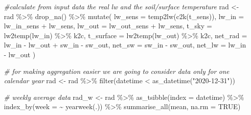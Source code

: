 \documentclass[
]{article}
\newenvironment{Shaded}{\begin{snugshade}}{\end{snugshade}}
\newcommand{\AttributeTok}[1]{\textcolor[rgb]{0.77,0.63,0.00}{#1}}
\newcommand{\CommentTok}[1]{\textcolor[rgb]{0.56,0.35,0.01}{\textit{#1}}}
\newcommand{\ConstantTok}[1]{\textcolor[rgb]{0.00,0.00,0.00}{#1}}
\newcommand{\FunctionTok}[1]{\textcolor[rgb]{0.00,0.00,0.00}{#1}}
\newcommand{\NormalTok}[1]{#1}
\newcommand{\OtherTok}[1]{\textcolor[rgb]{0.56,0.35,0.01}{#1}}
\newcommand{\SpecialCharTok}[1]{\textcolor[rgb]{0.00,0.00,0.00}{#1}}
\newcommand{\StringTok}[1]{\textcolor[rgb]{0.31,0.60,0.02}{#1}}
\begin{document}
\begin{Shaded}
\begin{Highlighting}[]
\CommentTok{\#calculate from input data the real lw and the soil/surface temperature}
\NormalTok{rad }\OtherTok{\textless{}{-}}\NormalTok{ rad }\SpecialCharTok{\%\textgreater{}\%}
  \FunctionTok{drop\_na}\NormalTok{() }\SpecialCharTok{\%\textgreater{}\%}
  \FunctionTok{mutate}\NormalTok{(}
    \AttributeTok{lw\_sens =} \FunctionTok{temp2lw}\NormalTok{(}\FunctionTok{c2k}\NormalTok{(t\_sens)),}
    \AttributeTok{lw\_in =}\NormalTok{ lw\_in\_sens }\SpecialCharTok{+}\NormalTok{ lw\_sens,}
    \AttributeTok{lw\_out =}\NormalTok{ lw\_out\_sens }\SpecialCharTok{+}\NormalTok{ lw\_sens,}
    \AttributeTok{t\_sky =} \FunctionTok{lw2temp}\NormalTok{(lw\_in) }\SpecialCharTok{\%\textgreater{}\%}\NormalTok{ k2c,}
    \AttributeTok{t\_surface =} \FunctionTok{lw2temp}\NormalTok{(lw\_out) }\SpecialCharTok{\%\textgreater{}\%}\NormalTok{ k2c,}
    \AttributeTok{net\_rad =}\NormalTok{ lw\_in }\SpecialCharTok{{-}}\NormalTok{ lw\_out }\SpecialCharTok{+}\NormalTok{ sw\_in }\SpecialCharTok{{-}}\NormalTok{ sw\_out,}
    \AttributeTok{net\_sw =}\NormalTok{ sw\_in }\SpecialCharTok{{-}}\NormalTok{ sw\_out,}
    \AttributeTok{net\_lw =}\NormalTok{ lw\_in }\SpecialCharTok{{-}}\NormalTok{ lw\_out}
\NormalTok{  )}
\end{Highlighting}
\end{Shaded}

\begin{Shaded}
\begin{Highlighting}[]
\CommentTok{\# for making aggregation easier we are going to consider data only for one calendar year}
\NormalTok{rad }\OtherTok{\textless{}{-}}\NormalTok{ rad }\SpecialCharTok{\%\textgreater{}\%}
  \FunctionTok{filter}\NormalTok{(datetime }\SpecialCharTok{\textless{}} \FunctionTok{as\_datetime}\NormalTok{(}\StringTok{"2020{-}12{-}31"}\NormalTok{))}
\end{Highlighting}
\end{Shaded}

\begin{Shaded}
\begin{Highlighting}[]
\CommentTok{\# weekly average data}
\NormalTok{rad\_w }\OtherTok{\textless{}{-}}\NormalTok{ rad }\SpecialCharTok{\%\textgreater{}\%} 
  \FunctionTok{as\_tsibble}\NormalTok{(}\AttributeTok{index =}\NormalTok{ datetime) }\SpecialCharTok{\%\textgreater{}\%}
  \FunctionTok{index\_by}\NormalTok{(}\AttributeTok{week =} \SpecialCharTok{\textasciitilde{}} \FunctionTok{yearweek}\NormalTok{(.)) }\SpecialCharTok{\%\textgreater{}\%}
  \FunctionTok{summarise\_all}\NormalTok{(mean, }\AttributeTok{na.rm =} \ConstantTok{TRUE}\NormalTok{)}
\end{Highlighting}
\end{Shaded}
\end{document}
